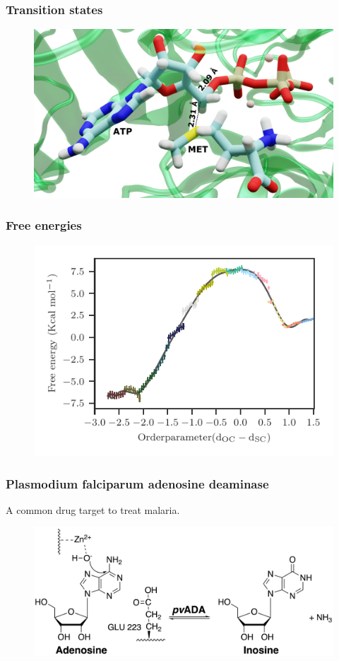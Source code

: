 \documentclass{beamer}
\begin{document}
\begin{frame}
\frametitle{Transition states}
\begin{figure}
\centering
\includegraphics[scale=0.1]{figures/mat2a-trans-labelled.png}
\end{figure}
\end{frame}
\begin{frame}
\frametitle{Free energies}
\begin{figure}
\includegraphics[scale=0.6]{figures/mat2a-fenergy.pdf}
\end{figure}
\end{frame}
\begin{frame}
\frametitle{Plasmodium falciparum adenosine deaminase}
A common drug target to treat malaria.
\begin{figure}
\includegraphics[scale=0.6]{figures/ada-reaction.png}
\end{figure}
\end{frame}
\end{document}
